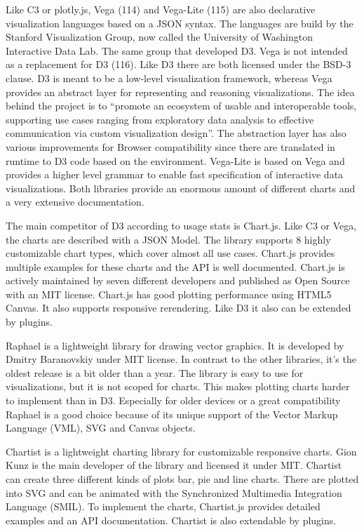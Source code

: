 \documentclass[american,a4paper,oneside,,tablecaptionabove]{scrbook}
\begin{document}
Like C3 or plotly.js, Vega (114) and Vega-Lite (115) are also
declarative visualization languages based on a JSON syntax. The
languages are build by the Stanford Visualization Group, now called the
University of Washington Interactive Data Lab. The same group that
developed D3. Vega is not intended as a replacement for D3 (116). Like
D3 there are both licensed under the BSD-3 clause. D3 is meant to be a
low-level visualization framework, whereas Vega provides an abstract
layer for representing and reasoning visualizations. The idea behind the
project is to \enquote{promote an ecosystem of usable and interoperable
tools, supporting use cases ranging from exploratory data analysis to
effective communication via custom visualization design}. The
abstraction layer has also various improvements for Browser
compatibility since there are translated in runtime to D3 code based on
the environment. Vega-Lite is based on Vega and provides a higher level
grammar to enable fast specification of interactive data visualizations.
Both libraries provide an enormous amount of different charts and a very
extensive documentation.

The main competitor of D3 according to usage stats is Chart.js. Like C3
or Vega, the charts are described with a JSON Model. The library
supports 8 highly customizable chart types, which cover almost all use
cases. Chart.js provides multiple examples for these charts and the API
is well documented. Chart.js is actively maintained by seven different
developers and published as Open Source with an MIT license. Chart.js
has good plotting performance using HTML5 Canvas. It also supports
responsive rerendering. Like D3 it also can be extended by plugins.

Raphael is a lightweight library for drawing vector graphics. It is
developed by Dmitry Baranovskiy under MIT license. In contrast to the
other libraries, it's the oldest release is a bit older than a year. The
library is easy to use for visualizations, but it is not scoped for
charts. This makes plotting charts harder to implement than in D3.
Especially for older devices or a great compatibility Raphael is a good
choice because of its unique support of the Vector Markup Language
(VML), SVG and Canvas objects.

Chartist is a lightweight charting library for customizable responsive
charts. Gion Kunz is the main developer of the library and licensed it
under MIT. Chartist can create three different kinds of plots bar, pie
and line charts. There are plotted into SVG and can be animated with the
Synchronized Multimedia Integration Language (SMIL). To implement the
charts, Chartist.js provides detailed examples and an API documentation.
Chartist is also extendable by plugins.
\end{document}
